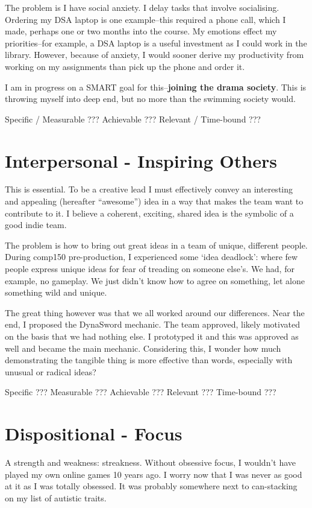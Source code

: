 \documentclass{scrartcl}
\begin{document}
The problem is I have social anxiety. I delay tasks that involve socialising. Ordering my DSA laptop is one example--this required a phone call, which I made, perhaps one or two months into the course. My emotions effect my priorities--for example, a DSA laptop is a useful investment as I could work in the library. However, because of anxiety, I would sooner derive my productivity from working on my assignments than pick up the phone and order it.

I am in progress on a SMART goal for this--\textbf{joining the drama society}. This is throwing myself into deep end, but no more than the swimming society would. 

Specific    /
Measurable ???
Achievable ???
Relevant    /
Time-bound ???

\section{Interpersonal - Inspiring Others}

This is essential. To be a creative lead I must effectively convey an interesting and appealing (hereafter ``awesome'') idea in a way that makes the team want to contribute to it. I believe a coherent, exciting, shared idea is the symbolic of a good indie team.

The problem is how to bring out great ideas in a team of unique, different people. During comp150 pre-production, I experienced some `idea deadlock': where few people express unique ideas for fear of treading on someone else's. We had, for example, no gameplay. We just didn't know how to agree on something, let alone something wild and unique.

The great thing however was that we all worked around our differences. Near the end, I proposed the DynaSword mechanic. The team approved, likely motivated on the basis that we had nothing else. I prototyped it and this was approved as well and became the main mechanic. Considering this, I wonder how much demonstrating the tangible thing is more effective than words, especially with unusual or radical ideas?

Specific   ???
Measurable ???
Achievable ???
Relevant   ???
Time-bound ???

\section{Dispositional - Focus}

A strength and weakness: streakness. Without obsessive focus, I wouldn't have played my own online games 10 years ago. I worry now that I was never as good at it as I was totally obsessed. It was probably somewhere next to can-stacking on my list of autistic traits.
\end{document}

